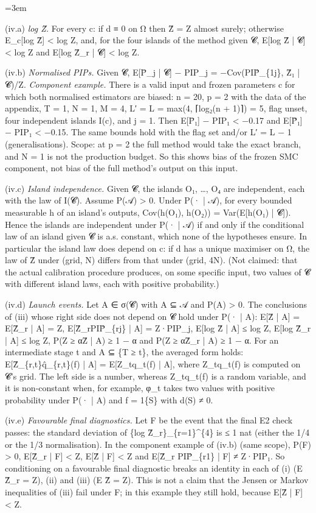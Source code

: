 \documentclass[11pt]{report}
\newenvironment{mdblock}{\begingroup\mdfont\raggedright\setlength{\parindent}{0pt}\setlength{\parskip}{0.55em}\emergencystretch=3em}{\par\endgroup}
\begin{document}
\begin{mdblock}
\begin{mdbul}
\item (iv.a) \emph{log Ẑ.} For every c: if d ≡ 0 on Ω then Ẑ = Z almost surely; otherwise E\_c[log Ẑ] < log Z, and, for the four islands of the method given 𝓒, E[log Ẑ | 𝓒] < log Z and E[log Ẑ\_r | 𝓒] < log Z.
\item (iv.b) \emph{Normalised PIPs.} Given 𝓒, E[P̄\_j | 𝓒] − PIP\_j = −Cov(PIP̂\_\{1j\}, Ẑ₁ | 𝓒)/Z. \emph{Component example.} There is a valid input and frozen parameters c for which both normalised estimators are biased: n = 20, p = 2 with the data of the appendix, T = 1, N = 1, M = 4, L′ = L = max(4, ⌈log₂(n + 1)⌉) = 5, flag unset, four independent islands I(c), and j = 1. Then E[P̄₁] − PIP₁ < −0.17 and E[P̃₁] − PIP₁ < −0.15. The same bounds hold with the flag set and/or L′ = L − 1 (generalisations). Scope: at p = 2 the full method would take the exact branch, and N = 1 is not the production budget. So this shows bias of the frozen SMC component, not bias of the full method's output on this input.
\item (iv.c) \emph{Island independence.} Given 𝓒, the islands O₁, …, O₄ are independent, each with the law of I(𝓒). Assume P(𝒜) > 0. Under P(· | 𝒜), for every bounded measurable h of an island's outputs, Cov(h(O₁), h(O₂)) = Var(E[h(O₁) | 𝓒]). Hence the islands are independent under P(· | 𝒜) if and only if the conditional law of an island given 𝓒 is a.s. constant, which none of the hypotheses ensure. In particular the island law does depend on c: if d has a unique maximiser on Ω, the law of Ẑ under (grid, N) differs from that under (grid, 4N). (Not claimed: that the actual calibration procedure produces, on some specific input, two values of 𝓒 with different island laws, each with positive probability.)
\item (iv.d) \emph{Launch events.} Let A ∈ σ(𝓒) with A ⊆ 𝒜 and P(A) > 0. The conclusions of (iii) whose right side does not depend on 𝓒 hold under P(· | A): E[Ẑ | A] = E[Ẑ\_r | A] = Z, E[Ẑ\_rPIP̂\_\{rj\} | A] = Z·PIP\_j, E[log Ẑ | A] ≤ log Z, E[log Ẑ\_r | A] ≤ log Z, P(Z ≥ αẐ | A) ≥ 1 − α and P(Z ≥ αẐ\_r | A) ≥ 1 − α. For an intermediate stage t and A ⊆ \{T ≥ t\}, the averaged form holds: E[Ẑ\_\{r,t\}q̂\_\{r,t\}(f) | A] = E[Z\_tq\_t(f) | A], where Z\_tq\_t(f) is computed on 𝓒's grid. The left side is a number, whereas Z\_tq\_t(f) is a random variable, and it is non-constant when, for example, φ\_t takes two values with positive probability under P(· | A) and f = 1\{S\} with d(S) ≠ 0.
\item (iv.e) \emph{Favourable final diagnostics.} Let F be the event that the final E2 check passes: the standard deviation of \{log Ẑ\_r\}\_\{r=1\}\textasciicircum{}\{4\} is ≤ 1 nat (either the 1/4 or the 1/3 normalisation). In the component example of (iv.b) (same scope), P(F) > 0, E[Ẑ\_r | F] < Z, E[Ẑ | F] < Z and E[Ẑ\_r PIP̂\_\{r1\} | F] ≠ Z·PIP₁. So conditioning on a favourable final diagnostic breaks an identity in each of (i) (E Ẑ\_r = Z), (ii) and (iii) (E Ẑ = Z). This is not a claim that the Jensen or Markov inequalities of (iii) fail under F; in this example they still hold, because E[Ẑ | F] < Z.

\end{mdbul}
\end{mdblock}
\end{document}
